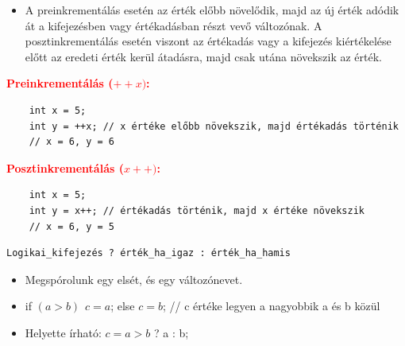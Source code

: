 \documentclass[11pt,a4paper]{article}
\begin{document}
            \begin{tcolorbox}[colback=blue!5!white,colframe=blue!50!black,title= 47. Ismertesse példával a pre-és posztinkrementálás közti különbséget!]
                \begin{itemize}
                    \item A preinkrementálás esetén az érték előbb növelődik, majd az új érték adódik át a kifejezésben vagy értékadásban részt vevő változónak. A posztinkrementálás esetén viszont az értékadás vagy a kifejezés kiértékelése előtt az eredeti érték kerül átadásra, majd csak utána növekszik az érték.
                \end{itemize}
                \textcolor{red}{\textbf{Preinkrementálás (\(++x)\):}}
                \begin{Verbatim}
    int x = 5;
    int y = ++x; // x értéke előbb növekszik, majd értékadás történik
    // x = 6, y = 6
                \end{Verbatim}
                \textcolor{red}{\textbf{Posztinkrementálás (\(x++)\):}}
                \begin{Verbatim}
    int x = 5;
    int y = x++; // értékadás történik, majd x értéke növekszik 
    // x = 6, y = 5
                \end{Verbatim}
            \end{tcolorbox}

            \begin{tcolorbox}[colback=blue!5!white,colframe=blue!50!black,title= 48.  Ismertesse a C nyelv háromoperandusú operátorát!]
            \begin{Verbatim}
Logikai_kifejezés ? érték_ha_igaz : érték_ha_hamis
            \end{Verbatim}
                \begin{itemize}
                    \item Megspórolunk egy elsét, és egy változónevet.
                    \item if \((a>b)\hspace{5pt} c=a\); else \(c=b\); // c értéke legyen a nagyobbik a és b közül
                    \item Helyette írható: \(c = a>b\) ? a : b;
                \end{itemize}
            \end{tcolorbox}
\end{document}

